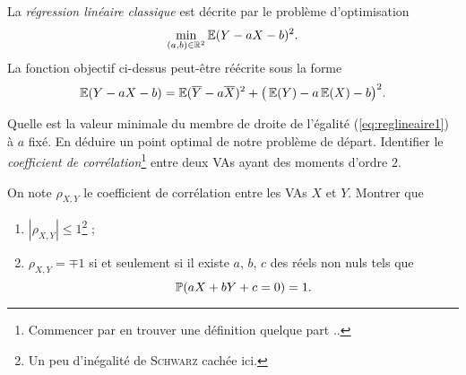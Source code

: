 \documentclass[11pt, a4paper]{article}
\begin{document}
La \emph{régression linéaire} \textit{classique} est décrite par le
problème d'optimisation
\[
  \min_{(a, b) \in \mathbb{R}^2} \operatorname{\mathbb{E}}(Y - aX - b)^2.
\]
La fonction objectif ci-dessus peut-être réécrite sous la forme
\begin{equation}
  \label{eq:reglineaire1}
  \operatorname{\mathbb{E}}(Y - aX - b) = \operatorname{\mathbb{E}}(\overline{Y} - a\overline{X})^2 + \big(\operatorname{\mathbb{E}}(Y)
  - a \operatorname{\mathbb{E}}(X) - b\big)^2.
\end{equation}
\begin{question}
  Quelle est la valeur minimale du membre de droite de l'égalité
  (\ref{eq:reglineaire1}) à $a$ fixé. En déduire un point optimal de
  notre problème de départ. Identifier le \emph{coefficient de
    corrélation}\footnote{Commencer par en trouver une définition
    quelque part ..}  entre deux VAs ayant des moments d'ordre $2$.
\end{question}
\begin{question}
  On note $\rho_{X, Y}$ le coefficient de corrélation entre les VAs
  $X$ et $Y$. Montrer que
  \begin{enumerate}
  \item $|\rho_{X, Y}| \leq 1$\footnote{Un peu d'inégalité de
      \textsc{Schwarz} cachée ici.} ;
  \item $\rho_{X, Y} = \mp 1$ si et seulement si il existe $a$, $b$,
    $c$ des réels non nuls tels que
    \[
      \operatorname{\mathbb{P}}(aX + bY + c = 0) = 1.
    \]
  \end{enumerate}
\end{question}



\end{document}
